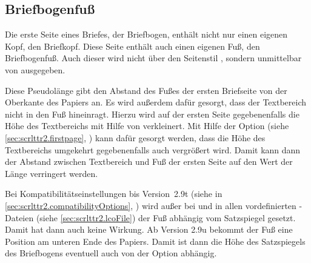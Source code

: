 \subsection{Briefbogenfuß}
%
\BeginIndexGroup
{}%

Die erste Seite eines Briefes, der Briefbogen, enthält nicht nur einen eigenen
Kopf, den Briefkopf. Diese Seite enthält auch einen eigenen
Fuß, den Briefbogenfuß. %
\iftrue%
Auch dieser wird nicht über den Seitenstil%
\else%
Genau wie der Briefkopf wird der Briefbogenfuß nicht über den Seitenstil%
\fi%
, sondern unmittelbar von %
 ausgegeben.


\begin{Declaration}
\end{Declaration}
Diese Pseudolänge gibt den Abstand des Fußes der ersten Briefseite von der
Oberkante des Papiers an. Es wird außerdem dafür gesorgt, dass der Textbereich
nicht in den Fuß hineinragt. Hierzu wird auf der ersten Seite gegebenenfalls
die Höhe des Textbereichs mit Hilfe von
%
 verkleinert. Mit Hilfe der Option
%
 (siehe
\autoref{sec:scrlttr2.firstpage},
) kann dafür gesorgt werden,
dass die Höhe des Textbereichs umgekehrt gegebenenfalls auch vergrößert
wird. Damit kann dann der Abstand zwischen Textbereich und Fuß der ersten
Seite auf den Wert der Länge
verringert werden.

Bei
Kompatibilitätseinstellungen bis
Version~2.9t (siehe  in
\autoref{sec:scrlttr2.compatibilityOptions},
) wird außer bei  und
 in allen vordefinierten
-Dateien
(siehe \autoref{sec:scrlttr2.lcoFile}) der Fuß abhängig vom Satzspiegel
gesetzt.  Damit hat dann auch %
 keine Wirkung. Ab
Version 2.9u bekommt der Fuß eine Position am unteren Ende des Papiers. Damit
ist dann die Höhe des Satzspiegels des Briefbogens eventuell auch von der
Option  abhängig.

